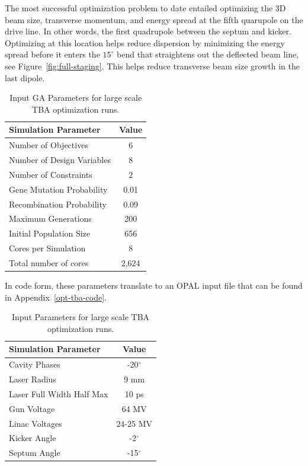 \label{setup}
The most successful optimization problem to date entailed optimizing the 
3D beam size, transverse momentum, and energy spread at the fifth quarupole on the drive line.
In other words, the first quadrupole between the septum and kicker.
Optimizing at this location helps reduce dispersion by minimizing 
the energy spread before it enters the $15^\circ$ bend that straightens out 
the deflected beam line, see Figure~\ref{fig:full-staging}.
This helps reduce transverse beam size growth in the last dipole.
\begin{table}%
	\begin{center}
		\caption{Input GA Parameters for large scale TBA optimization runs.}
		\label{tab:opt-tba}
		\begin{tabular}{lc}
			\toprule
			\toprule
			\textbf{Simulation Parameter} 	&  \textbf{Value} \\ 
			\midrule
			{Number of Objectives}			&  6 \\
			Number of Design Variables		&  8 \\
			Number of Constraints			&  2 \\
			{Gene Mutation Probability} 	&  0.01\\ 
			{Recombination Probability} 	&  0.09 \\
			{Maximum  Generations}			&  200 \\
			{Initial  Population Size}		&  656\\ 
			Cores per Simulation 			&  8 \\
			Total number of cores			& 2,624  \\
			\bottomrule
		\end{tabular}
	\end{center}
\end{table}
In code form, these parameters translate to an OPAL input file that 
can be found in Appendix~\ref{opt-tba-code}.
\begin{table}%
	\begin{center}
		\caption{ Input Parameters for large scale TBA optimization runs.}
		\label{tab:variables}
		\begin{tabular}{lc}
			\toprule
			\toprule
			\textbf{Simulation Parameter} 	&  \textbf{Value} \\ 
			\midrule
			Cavity Phases		&  -20$^\circ$ \\
			Laser Radius		& 9 mm \\
			Laser Full Width Half Max	& 10 ps \\
			Gun Voltage 				& 64 MV\\ 
			Linac Voltages 				& 24-25 MV \\
			Kicker Angle				& -2$^\circ$ \\
			Septum Angle				& -15$^\circ$\\ 
			\bottomrule
		\end{tabular}
	\end{center}
\end{table}
